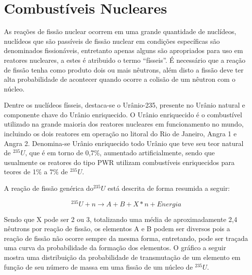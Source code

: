 \documentclass[
	12pt,				%
	openany,			%
	twoside,			%
	a4paper,			%
	english,			%
	french,				%
	spanish,			%
	brazil				%
	]{abntex2}
\begin{document}
\section{Combustíveis Nucleares}

As reações de fissão nuclear ocorrem em uma grande quantidade de nuclídeos, nuclídeos que são passíveis de fissão nuclear em condições específicas são denominados fissionáveis, entretanto apenas alguns são apropriados para uso em reatores nucleares, a estes é atribuido o termo ``físseis''. É necessário que a reação de fissão tenha como produto dois ou mais nêutrons, além disto a fissão deve ter alta probabilidade de acontecer quando ocorre a colisão de um nêutron com o núcleo.

Dentre os nuclídeos físseis, destaca-se o Urânio-235, presente no Urânio natural e componente chave do Urânio enriquecido. O Urânio enriquecido é o combustível utilizado na grande maioria dos reatores nucleares em funcionamento no mundo, incluindo os dois reatores em operação no litoral do Rio de Janeiro, Angra 1 e Angra 2. Denomina-se Urânio enriquecido todo Urânio que teve seu teor natural de $^{235}U$, que é em torno de 0,7\%, aumentado artificialmente, sendo que usualmente os reatores do tipo PWR utilizam combustíveis enriquecidos para teores de 1\% a 7\% de $^{235}U$. 

A reação de fissão genérica do$^{235}U$ está descrita de forma resumida a seguir:

\[
^{235}U+n\longrightarrow A+B+X*n+Energia
\]

Sendo que X pode ser 2 ou 3, totalizando uma média de aproximadamente
2,4 nêutrons por reação de fissão, os elementos A e B podem ser diversos
pois a reação de fissão não ocorre sempre da mesma forma, entretando,
pode ser traçada uma curva da probabilidade da formação dos elementos.
O gráfico a seguir mostra uma distribuição da probabilidade de transmutação
de um elemento em função de seu número de massa em uma fissão de um
núcleo de $^{235}U$.
\end{document}
